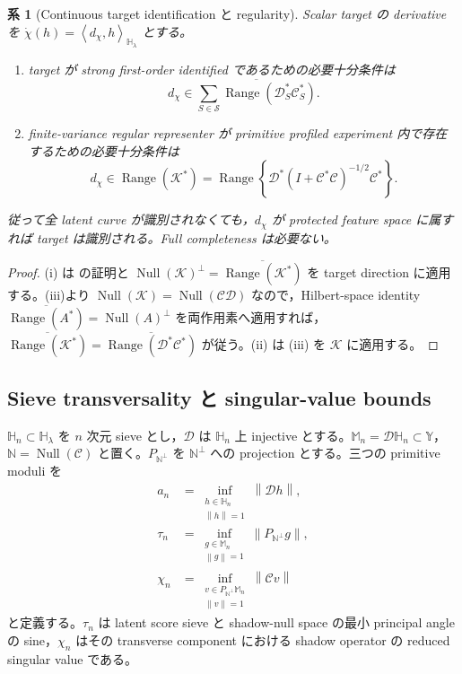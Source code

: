 \documentclass[11pt,a4paper]{ltjsarticle}
\newtheorem{corollary}{系}[section]
\theoremstyle{remark}
\newcommand{\norm}[1]{\left\lVert#1\right\rVert}
\newcommand{\inner}[2]{\left\langle#1,#2\right\rangle}
\newcommand{\cS}{\mathcal S}
\newcommand{\Cop}{\mathscr C}
\newcommand{\Jcal}{\mathscr D}
\newcommand{\Kop}{\mathscr K}
\newcommand{\Null}{\operatorname{Null}}
\newcommand{\Range}{\operatorname{Range}}
\begin{document}
\begin{corollary}[Continuous target identification と regularity]\label{cor:continuoustarget}
Scalar target の derivative を $\dot\chi(h)=\inner{d_\chi}{h}_{\mathbb H_\lambda}$ とする。
\begin{enumerate}[label=(\roman*)]
\item target が strong first-order identified であるための必要十分条件は
\begin{equation}
 d_\chi\in
\overline{\sum_{S\in\cS}\Range(\Jcal_S^*\Cop_S^*)}.
\label{eq:continuoustargetclosure}
\end{equation}
\item finite-variance regular representer が primitive profiled experiment 内で存在するための必要十分条件は
\begin{equation}
 d_\chi\in\Range(\Kop^*)
=\Range\left\{
\Jcal^*(I+\Cop^*\Cop)^{-1/2}\Cop^*
\right\}.
\label{eq:continuoustargetrange}
\end{equation}
\end{enumerate}
従って全 latent curve が識別されなくても，$d_\chi$ が protected feature space に属すれば target は識別される。Full completeness は必要ない。
\end{corollary}

\begin{proof}
(i) は  の証明と $\Null(\Kop)^\perp=\overline{\Range(\Kop^*)}$ を target direction に適用する。(iii)より $\Null(\Kop)=\Null(\Cop\Jcal)$ なので，Hilbert-space identity $\overline{\Range(A^*)}=\Null(A)^\perp$ を両作用素へ適用すれば，$\overline{\Range(\Kop^*)}=\overline{\Range(\Jcal^*\Cop^*)}$ が従う。(ii) は (iii) を $\Kop$ に適用する。
\end{proof}

\subsection{Sieve transversality と singular-value bounds}

$\mathbb H_n\subset\mathbb H_\lambda$ を $n$ 次元 sieve とし，$\Jcal$ は $\mathbb H_n$ 上 injective とする。$\mathbb M_n=\Jcal\mathbb H_n\subset\mathbb Y$，$\mathbb N=\Null(\Cop)$ と置く。$P_{\mathbb N^\perp}$ を $\mathbb N^\perp$ への projection とする。三つの primitive moduli を
\begin{align}
 a_n
&=\inf_{\substack{h\in\mathbb H_n\\\norm h=1}}
\norm{\Jcal h},
\label{eq:anJ}\\
 \tau_n
&=\inf_{\substack{g\in\mathbb M_n\\\norm g=1}}
\norm{P_{\mathbb N^\perp}g},
\label{eq:taunangle}\\
 \chi_n
&=\inf_{\substack{v\in P_{\mathbb N^\perp}\mathbb M_n\\\norm v=1}}
\norm{\Cop v}
\label{eq:chinshadow}
\end{align}
と定義する。$\tau_n$ は latent score sieve と shadow-null space の最小 principal angle の sine，$\chi_n$ はその transverse component における shadow operator の reduced singular value である。
\end{document}
